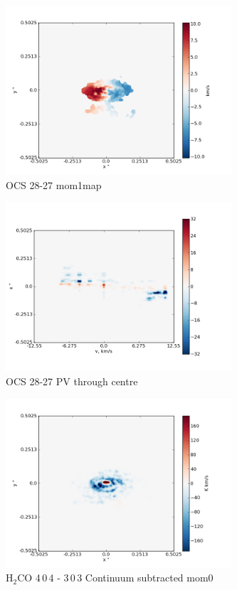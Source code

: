 \documentclass[useAMS,usenatbib]{mn2e}
\begin{document}
\begin{figure}
 \includegraphics[width=84mm]{Figures/sim/imageOCS_28-27_30deg_mom1.png}

 \caption{OCS 28-27 mom1map}
\end{figure}

\begin{figure}
 \includegraphics[width=84mm]{Figures/sim/imageOCS_28-27_30deg_PV_centre.png}

 \caption{OCS 28-27 PV through centre}
\end{figure}



\begin{figure}
 \includegraphics[width=84mm]{Figures/sim/imageH2CO_4-0-4->3-0-3_30deg_contSub.png}

 \caption{H$_2$CO 4$\,$0$\,$4 - 3$\,$0$\,$3 Continuum subtracted mom0}
\end{figure}
\end{document}
